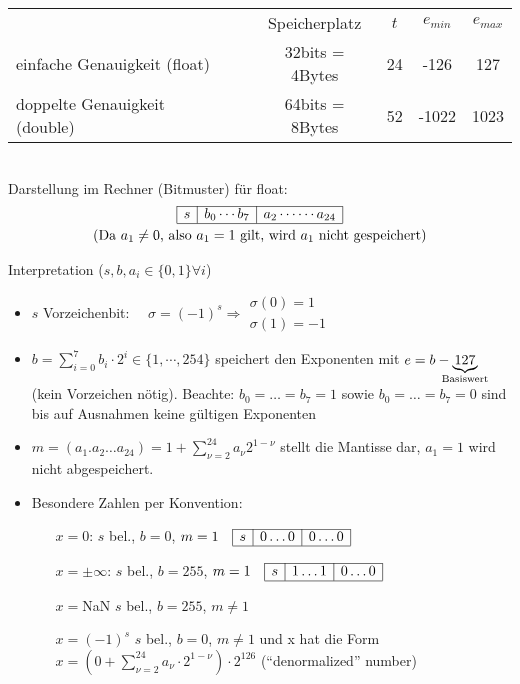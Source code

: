 \begin{tabular}{l@{}cccc@{}}
  & Speicherplatz & $t$ & $e_{min}$ & $e_{max}$ \\
  \cmidrule{2-5}
  einfache Genauigkeit (float) \index{floating point} & 32bits = 4Bytes & 24 &-126 & 127 \\
  doppelte  Genauigkeit (double)~~\index{double} & 64bits = 8Bytes& 52 & -1022 & 1023
\end{tabular}\\

Darstellung im Rechner (Bitmuster) für float:
\begin{gather*}
  \floatbox{s}{b_0\cdots b_7}{a_2\cdots\cdots a_{24}}\\
  \text{(Da $a_1\neq 0$, also $a_1=1$ gilt, wird $a_1$ nicht gespeichert)}
\end{gather*}

Interpretation ($s,b,a_i\in\{0,1\} \forall i$)
\begin{itemize}
\item $s$ Vorzeichenbit: 
  $\quad \sigma=(-1)^s\Rightarrow 
  \begin{array}{l}
    \sigma(0)=1 \\
    \sigma(1)=-1
  \end{array} $
\item $b=\sum_{i=0}^{7}b_i\cdot2^i \in \{1, \cdots, 254\}$ 
  speichert den Exponenten mit 
  $e = b-\underbrace{127}_{\mathclap{\text{Basiswert}}}$ (kein Vorzeichen nötig).
  Beachte: $b_0=\ldots=b_7=1$ sowie $b_0=\ldots=b_7=0$ sind bis auf Ausnahmen keine gültigen Exponenten
\item $m=(a_1.a_2\ldots a_{24})=1+\sum_{\nu=2}^{24}a_{\nu}2^{1-\nu}$ stellt die Mantisse dar, $a_1=1$ wird nicht abgespeichert.
\item Besondere Zahlen per Konvention:
  \begin{itemize}
  \item[$x=0$:] $s$ bel., $b=0$, $m=1 \quad \floatbox{s}{0\ldots0}{0\ldots0}$
  \item[$x=\pm\infty$:]  $s$ bel., $b=255$, $m=1  \quad \floatbox{s}{1\ldots1}{0\ldots0}$
  \item[$x=$NaN] $s$ bel., $b=255$, $m\neq 1$
  \item[$x=(-1)^s$] $s$ bel., $b=0$, $m\neq 1$ und x hat die Form $x=(0+\sum_{\nu=2}^{24}a_{\nu}\cdot 2^{1-\nu})\cdot 2^{126}$ (\enquote{denormalized} number)
  \end{itemize}
\end{itemize}

